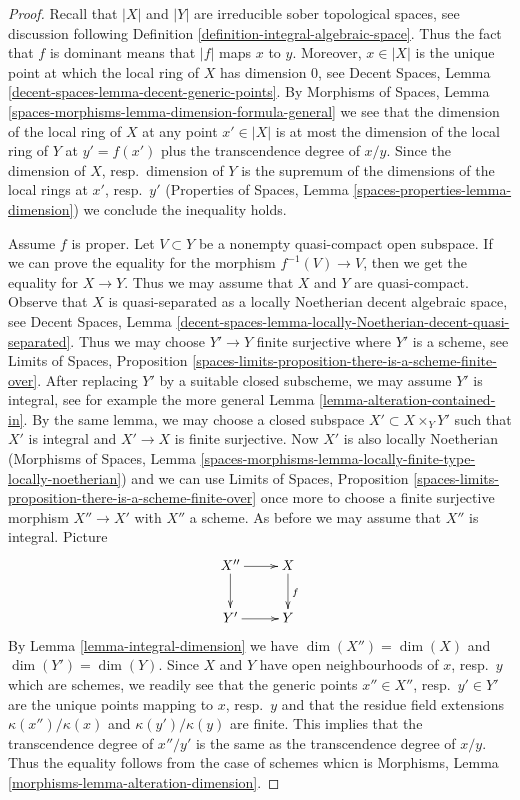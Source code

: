 \documentclass[10pt,a4paper]{amsart}
\theoremstyle{plain}
\theoremstyle{definition}
\theoremstyle{remark}
\numberwithin{equation}{subsection}
\begin{document}
\begin{proof}
Recall that $|X|$ and $|Y|$ are irreducible sober topological spaces, see
discussion following Definition \ref{definition-integral-algebraic-space}.
Thus the fact that $f$ is dominant means that $|f|$ maps $x$ to $y$.
Moreover, $x \in |X|$ is the unique point at which the
local ring of $X$ has dimension $0$, see
Decent Spaces, Lemma \ref{decent-spaces-lemma-decent-generic-points}.
By Morphisms of Spaces, Lemma
\ref{spaces-morphisms-lemma-dimension-formula-general}
we see that the dimension of the local ring of $X$ at
any point $x' \in |X|$ is at most the dimension of the local
ring of $Y$ at $y' = f(x')$ plus the transcendence degree of $x/y$.
Since the dimension of $X$, resp.\ dimension of $Y$ is the
supremum of the dimensions of the local rings at $x'$, resp.\ $y'$
(Properties of Spaces, Lemma \ref{spaces-properties-lemma-dimension})
we conclude the inequality holds.

\medskip\noindent
Assume $f$ is proper.
Let $V \subset Y$ be a nonempty quasi-compact open subspace.
If we can prove the equality for the morphism $f^{-1}(V) \to V$,
then we get the equality for $X \to Y$. Thus we may assume that
$X$ and $Y$ are quasi-compact.
Observe that $X$ is quasi-separated as
a locally Noetherian decent algebraic space, see
Decent Spaces, Lemma
\ref{decent-spaces-lemma-locally-Noetherian-decent-quasi-separated}.
Thus we may choose $Y' \to Y$ finite surjective where $Y'$
is a scheme, see Limits of Spaces, Proposition
\ref{spaces-limits-proposition-there-is-a-scheme-finite-over}.
After replacing $Y'$ by a suitable closed subscheme, we
may assume $Y'$ is integral, see for example the more general
Lemma \ref{lemma-alteration-contained-in}.
By the same lemma, we may choose a closed subspace
$X' \subset X \times_Y Y'$ such that $X'$ is integral
and $X' \to X$ is finite surjective.
Now $X'$ is also locally Noetherian
(Morphisms of Spaces, Lemma
\ref{spaces-morphisms-lemma-locally-finite-type-locally-noetherian})
and we can use Limits of Spaces, Proposition
\ref{spaces-limits-proposition-there-is-a-scheme-finite-over}
once more to choose a finite surjective morphism $X'' \to X'$
with $X''$ a scheme. As before we may assume that $X''$
is integral. Picture
$$
\xymatrix{
X'' \ar[d] \ar[r] & X \ar[d]^f \\
Y' \ar[r] & Y
}
$$
By Lemma \ref{lemma-integral-dimension} we have $\dim(X'') = \dim(X)$
and $\dim(Y') = \dim(Y)$. Since $X$ and $Y$ have open neighbourhoods
of $x$, resp.\ $y$ which are schemes, we readily see that the generic
points $x'' \in X''$, resp.\ $y' \in Y'$ are the unique points mapping
to $x$, resp.\ $y$ and that the residue field extensions
$\kappa(x'')/\kappa(x)$ and $\kappa(y')/\kappa(y)$ are finite.
This implies that the transcendence degree of $x''/y'$ is the
same as the transcendence degree of $x/y$. Thus the equality follows
from the case of schemes whicn is
Morphisms, Lemma \ref{morphisms-lemma-alteration-dimension}.
\end{proof}
\end{document}
